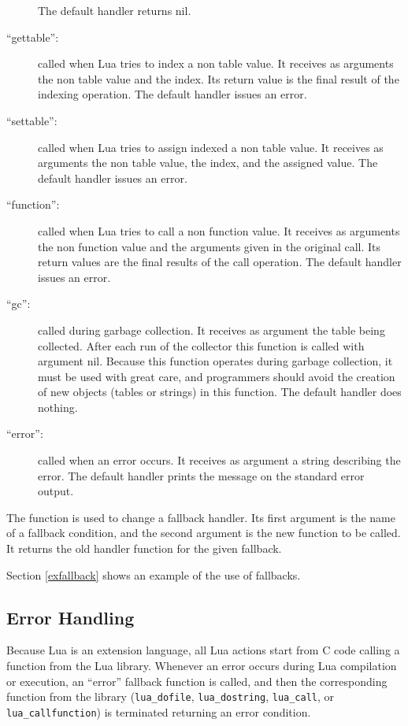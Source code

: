 \begin{description}
The default handler returns nil.
\item[``gettable'':]
called when Lua tries to index a non table value.
It receives as arguments the non table value and the index.
Its return value is the final result of the indexing operation.
The default handler issues an error.
\item[``settable'':]
called when Lua tries to assign indexed a non table value.
It receives as arguments the non table value,
the index, and the assigned value.
The default handler issues an error.
\item[``function'':]
called when Lua tries to call a non function value.
It receives as arguments the non function value and the
arguments given in the original call.
Its return values are the final results of the call operation.
The default handler issues an error.
\item[``gc'':]
called during garbage collection.
It receives as argument the table being collected.
After each run of the collector this function is called with argument nil.
Because this function operates during garbage collection,
it must be used with great care,
and programmers should avoid the creation of new objects
(tables or strings) in this function.
The default handler does nothing.
\item[``error'':]
called when an error occurs.
It receives as argument a string describing the error.
The default handler prints the message on the standard error output.
\end{description}

The function  is used to change a fallback handler.
Its first argument is the name of a fallback condition,
and the second argument is the new function to be called.
It returns the old handler function for the given fallback.

Section \ref{exfallback} shows an example of the use of fallbacks.


\subsection{Error Handling} \label{error}

Because Lua is an extension language,
all Lua actions start from C code calling a function from the Lua library.
Whenever an error occurs during Lua compilation or execution,
an ``error'' fallback function is called,
and then the corresponding function from the library
(\verb'lua_dofile', \verb'lua_dostring',
\verb'lua_call', or \verb'lua_callfunction')
is terminated returning an error condition.

